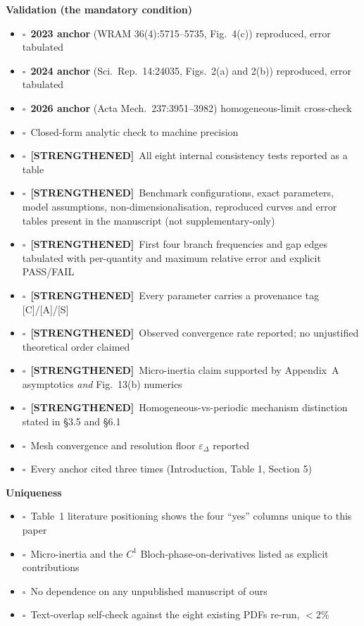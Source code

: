 \documentclass[11pt,a4paper]{article}
\newcommand{\STR}{{\color{strcol}\textbf{[STRENGTHENED]}}}
\newcommand{\chk}{$\square$~}
\begin{document}
\textbf{Validation (the mandatory condition)}
\begin{itemize}
\item \chk \textbf{2023 anchor} (WRAM 36(4):5715--5735, Fig.~4(c)) reproduced, error tabulated
\item \chk \textbf{2024 anchor} (Sci.\ Rep.\ 14:24035, Figs.~2(a) and 2(b)) reproduced, error tabulated
\item \chk \textbf{2026 anchor} (Acta Mech.\ 237:3951--3982) homogeneous-limit cross-check
\item \chk Closed-form analytic check to machine precision
\item \chk \STR\ All eight internal consistency tests reported as a table
\item \chk \STR\ Benchmark configurations, exact parameters, model assumptions, non-dimensionalisation, reproduced curves and error tables present in the manuscript (not supplementary-only)
\item \chk \STR\ First four branch frequencies and gap edges tabulated with per-quantity and maximum relative error and explicit PASS/FAIL
\item \chk \STR\ Every parameter carries a provenance tag [C]/[A]/[S]
\item \chk \STR\ Observed convergence rate reported; no unjustified theoretical order claimed
\item \chk \STR\ Micro-inertia claim supported by Appendix~A asymptotics \emph{and} Fig.~13(b) numerics
\item \chk \STR\ Homogeneous-vs-periodic mechanism distinction stated in \S3.5 and \S6.1
\item \chk Mesh convergence and resolution floor $\varepsilon_\Delta$ reported
\item \chk Every anchor cited three times (Introduction, Table 1, Section 5)
\end{itemize}

\textbf{Uniqueness}
\begin{itemize}
\item \chk Table~1 literature positioning shows the four ``yes'' columns unique to this paper
\item \chk Micro-inertia and the $C^1$ Bloch-phase-on-derivatives listed as explicit contributions
\item \chk No dependence on any unpublished manuscript of ours
\item \chk Text-overlap self-check against the eight existing PDFs re-run, $<$2\%
\end{itemize}
\end{document}
